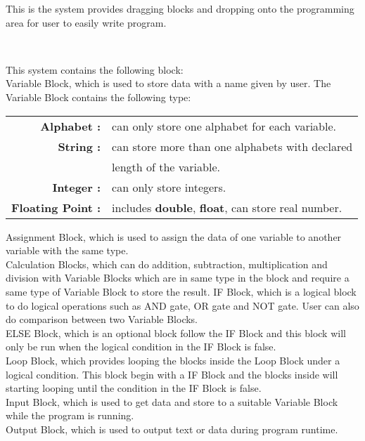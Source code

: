 This is the system provides dragging blocks and dropping onto the programming area for user to easily write program.\par~

This system contains the following block:\\
	Variable Block, which is used to store data with a name given by user. The Variable Block contains the following type:

	\begin{tabular}{r l}
		\textbf{Alphabet :} & can only store one alphabet for each variable.\\
		\textbf{String :} & can store more than one alphabets with declared\\
		& length of the variable.\\
		\textbf{Integer :} & can only store integers.\\
		\textbf{Floating Point :} & includes \textbf{double}, \textbf{float}, can store real number.
	\end{tabular}

	Assignment Block, which is used to assign the data of one variable to another variable with the same type.\\
	Calculation Blocks, which can do addition, subtraction, multiplication and division with Variable Blocks which are in same type in the block and require a same type of Variable Block to store the result.
	IF Block, which is a logical block to do logical operations such as AND gate, OR gate and NOT gate. User can also do comparison between two Variable Blocks.\\
	ELSE Block, which is an optional block follow the IF Block and this block will only be run when the logical condition in the IF Block is false.\\
	Loop Block, which provides looping the blocks inside the Loop Block under a logical condition. This block begin with a IF Block and the blocks inside will starting looping until the condition in the IF Block is false.\\
	Input Block, which is used to get data and store to a suitable Variable Block while the program is running.\\
	Output Block, which is used to output text or data during program runtime.\\
